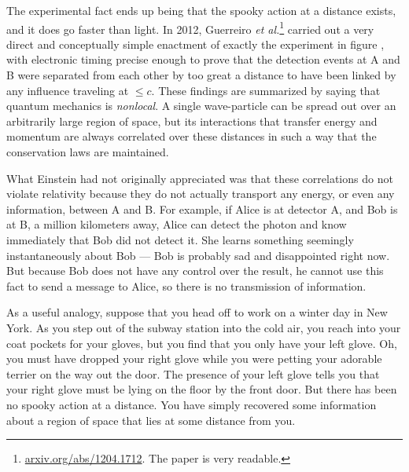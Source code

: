 The experimental fact ends up being that the spooky action at a
distance exists, and it does go faster than light. In 2012, Guerreiro
\emph{et al.}\footnote{\url{arxiv.org/abs/1204.1712}. The paper is
very readable.} carried out a very direct and conceptually simple
enactment of exactly the experiment in figure ,
with electronic timing precise enough to prove that the detection
events at A and B were separated from each other by too great a
distance to have been linked by any influence traveling at $\le c$.
These findings are summarized by saying that quantum mechanics is
\emph{nonlocal}.  A single wave-particle can be spread out over
an arbitrarily large region of space, but its interactions that
transfer energy and momentum are always correlated over these
distances in such a way that the conservation laws are maintained. 

What Einstein had not originally appreciated was that these
correlations do not violate relativity because they do not actually
transport any energy, or even any information, between A and B. For
example, if Alice is at detector A, and Bob is at B, a million
kilometers away, Alice can detect the photon and know immediately that
Bob did not detect it. She learns something seemingly instantaneously
about Bob --- Bob is probably sad and disappointed right now. But
because Bob does not have any control over the result, he cannot use
this fact to send a message to Alice, so there is no transmission of
information.

As a useful analogy, suppose that you head off to work on a winter day
in New York. As you step out of the subway station into the cold air,
you reach into your coat pockets for your gloves, but you find that
you only have your left glove. Oh, you must have dropped your right
glove while you were petting your adorable terrier on the way out the
door. The presence of your left glove tells you that your right glove
must be lying on the floor by the front door. But there has been no
spooky action at a distance. You have simply recovered some
information about a region of space that lies at some distance from
you.

